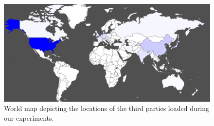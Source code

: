\documentclass{sig-alternate}
\begin{document}
\begin{figure}
 \centering
 \includegraphics[width=\textwidth]{figures/third_party_map.eps}
 \caption{World map depicting the locations of the third parties loaded during our experiments.}
 \label{fig:third_party_map}
\end{figure}
\end{document}
